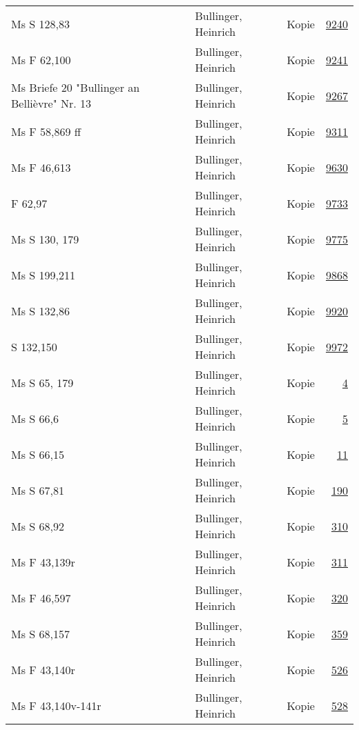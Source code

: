 \documentclass[10pt,a4paper,landscape]{report}
\begin{document}
\begin{longtable}{p{16cm}p{4cm}lr}
Ms S 128,83	&	Bullinger, Heinrich	&	Kopie	&	\href{http://130.60.24.72/assignment/9240}{9240}\\
Ms F 62,100	&	Bullinger, Heinrich	&	Kopie	&	\href{http://130.60.24.72/assignment/9241}{9241}\\
Ms Briefe 20 "Bullinger an Bellièvre" Nr. 13	&	Bullinger, Heinrich	&	Kopie	&	\href{http://130.60.24.72/assignment/9267}{9267}\\
Ms F 58,869 ff	&	Bullinger, Heinrich	&	Kopie	&	\href{http://130.60.24.72/assignment/9311}{9311}\\
Ms F 46,613	&	Bullinger, Heinrich	&	Kopie	&	\href{http://130.60.24.72/assignment/9630}{9630}\\
F 62,97	&	Bullinger, Heinrich	&	Kopie	&	\href{http://130.60.24.72/assignment/9733}{9733}\\
Ms S 130, 179	&	Bullinger, Heinrich	&	Kopie	&	\href{http://130.60.24.72/assignment/9775}{9775}\\
Ms S 199,211	&	Bullinger, Heinrich	&	Kopie	&	\href{http://130.60.24.72/assignment/9868}{9868}\\
Ms S 132,86	&	Bullinger, Heinrich	&	Kopie	&	\href{http://130.60.24.72/assignment/9920}{9920}\\
S 132,150	&	Bullinger, Heinrich	&	Kopie	&	\href{http://130.60.24.72/assignment/9972}{9972}\\
Ms S 65, 179	&	Bullinger, Heinrich	&	Kopie	&	\href{http://130.60.24.72/assignment/4}{4}\\
Ms S 66,6	&	Bullinger, Heinrich	&	Kopie	&	\href{http://130.60.24.72/assignment/5}{5}\\
Ms S 66,15	&	Bullinger, Heinrich	&	Kopie	&	\href{http://130.60.24.72/assignment/11}{11}\\
Ms S 67,81	&	Bullinger, Heinrich	&	Kopie	&	\href{http://130.60.24.72/assignment/190}{190}\\
Ms S 68,92	&	Bullinger, Heinrich	&	Kopie	&	\href{http://130.60.24.72/assignment/310}{310}\\
Ms F 43,139r	&	Bullinger, Heinrich	&	Kopie	&	\href{http://130.60.24.72/assignment/311}{311}\\
Ms F 46,597	&	Bullinger, Heinrich	&	Kopie	&	\href{http://130.60.24.72/assignment/320}{320}\\
Ms S 68,157	&	Bullinger, Heinrich	&	Kopie	&	\href{http://130.60.24.72/assignment/359}{359}\\
Ms F 43,140r	&	Bullinger, Heinrich	&	Kopie	&	\href{http://130.60.24.72/assignment/526}{526}\\
Ms F 43,140v-141r	&	Bullinger, Heinrich	&	Kopie	&	\href{http://130.60.24.72/assignment/528}{528}\\

\end{longtable}
\end{document}
